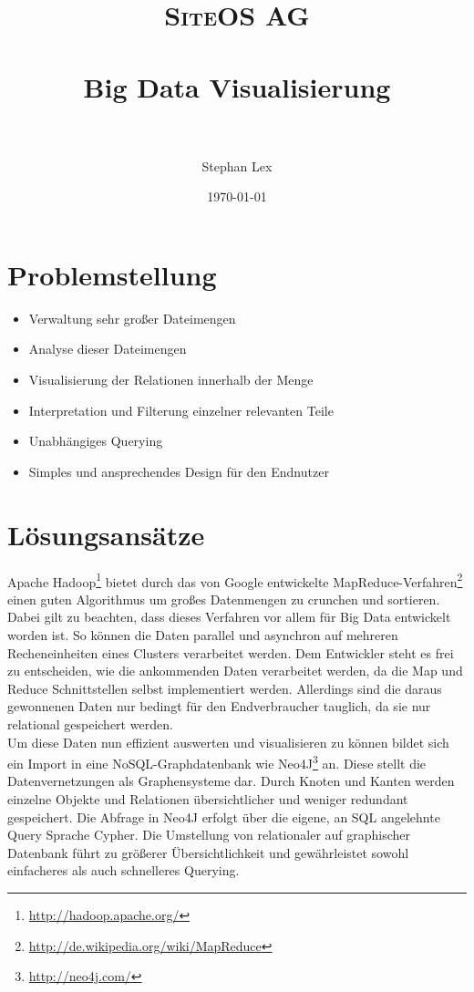 \documentclass[paper=a4, fontsize=11pt]{scrartcl}
\title{	
\normalfont \normalsize 
\textsc{SiteOS AG} \\ [10pt] %
\horrule{0.5pt} \\[0.4cm] %
\huge Big Data Visualisierung \\ %
\horrule{2pt} \\[0.5cm] %
}
\author{Stephan Lex} %
\date{\normalsize\today} %
\begin{document}
\maketitle %


\section*{Problemstellung}
\begin{itemize}
\item Verwaltung sehr gro\ss{}er Dateimengen
\item Analyse dieser Dateimengen
\item Visualisierung der Relationen innerhalb der Menge 
\item Interpretation und Filterung einzelner relevanten Teile
\item Unabh\"angiges Querying
\item Simples und ansprechendes Design f\"ur den Endnutzer
\\
\end{itemize}


\section*{L\"osungsans\"atze}

Apache Hadoop\footnote{\url{http://hadoop.apache.org/}} bietet durch das von Google entwickelte MapReduce-Verfahren\footnote{\url{http://de.wikipedia.org/wiki/MapReduce}} einen guten Algorithmus um gro\ss{}es Datenmengen zu crunchen und sortieren. Dabei gilt zu beachten, dass dieses Verfahren vor allem f\"ur Big Data entwickelt worden ist. So k\"onnen die Daten parallel und asynchron auf mehreren Recheneinheiten eines Clusters verarbeitet werden. Dem Entwickler steht es frei zu entscheiden, wie die ankommenden Daten verarbeitet werden, da die Map und Reduce Schnittstellen selbst implementiert werden. Allerdings sind die daraus gewonnenen Daten nur bedingt f\"ur den Endverbraucher tauglich, da sie nur relational gespeichert werden.\\

Um diese Daten nun effizient auswerten und visualisieren zu k\"onnen bildet sich ein Import in eine NoSQL-Graphdatenbank wie Neo4J\footnote{\url{http://neo4j.com/}} an. Diese stellt die Datenvernetzungen als Graphensysteme dar. Durch Knoten und Kanten werden einzelne Objekte und Relationen \"ubersichtlicher und weniger redundant gespeichert. Die Abfrage in Neo4J erfolgt \"uber die eigene, an SQL angelehnte Query Sprache Cypher. Die Umstellung von relationaler auf graphischer Datenbank f\"uhrt zu gr\"o\ss{}erer \"Ubersichtlichkeit und gew\"ahrleistet sowohl einfacheres als auch schnelleres Querying.\\
\end{document}
